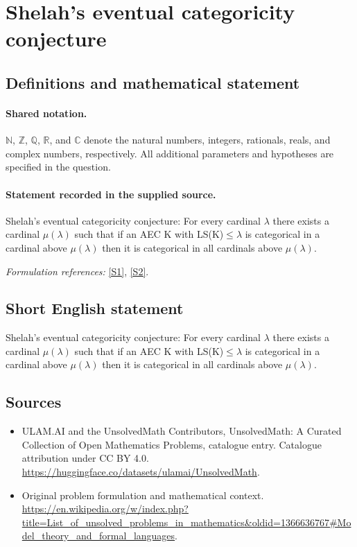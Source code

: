 \documentclass[11pt]{article}
\newcommand{\sref}[2]{\hyperlink{source:#1:#2}{[S#2]}}
\begin{document}
\section{Shelah's eventual categoricity conjecture}\label{statement}

\subsection{Definitions and mathematical statement}

\paragraph{Shared notation.}$\mathbb N$, $\mathbb Z$, $\mathbb Q$, $\mathbb R$, and $\mathbb C$ denote the natural numbers, integers, rationals, reals, and complex numbers, respectively. All additional parameters and hypotheses are specified in the question.


\paragraph{Statement recorded in the supplied source.}
Shelah's eventual categoricity conjecture: For every cardinal $\lambda$ there exists a cardinal $\mu(\lambda)$ such that if an AEC K with LS(K)${} \le \lambda$ is categorical in a cardinal above $\mu(\lambda)$ then it is categorical in all cardinals above $\mu(\lambda)$.
\par\smallskip\textit{Formulation references:} \sref{statement}{1}, \sref{statement}{2}.
\subsection{Short English statement}
Shelah's eventual categoricity conjecture: For every cardinal $\lambda$ there exists a cardinal $\mu(\lambda)$ such that if an AEC K with LS(K)${} \le \lambda$ is categorical in a cardinal above $\mu(\lambda)$ then it is categorical in all cardinals above $\mu(\lambda)$.
\subsection{Sources}
\begin{itemize}
\item[\hypertarget{source:statement:1}{S1}] ULAM.AI and the UnsolvedMath Contributors, UnsolvedMath: A Curated Collection of Open Mathematics Problems, catalogue entry. Catalogue attribution under CC BY 4.0.
\url{https://huggingface.co/datasets/ulamai/UnsolvedMath}.
\item[\hypertarget{source:statement:2}{S2}] Original problem formulation and mathematical context.
\url{https://en.wikipedia.org/w/index.php?title=List_of_unsolved_problems_in_mathematics&oldid=1366636767#Model_theory_and_formal_languages}.
\end{itemize}
\label{end:statement}
\end{document}
